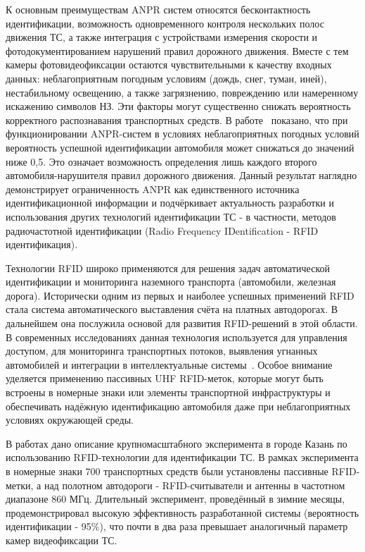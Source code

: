 \documentclass[12pt]{article}
\theoremstyle{definition}
\begin{document}
К основным преимуществам ANPR систем относятся бесконтактность идентификации, возможность одновременного контроля нескольких полос движения ТС, а также интеграция с устройствами измерения скорости и фотодокументированием нарушений правил дорожного движения. Вместе с тем камеры фотовидеофиксации остаются чувствительными к качеству входных данных: неблагоприятным погодным условиям (дождь, снег, туман, иней), нестабильному освещению, а также загрязнению, повреждению или намеренному искажению символов НЗ. Эти факторы могут существенно снижать вероятность корректного распознавания транспортных средств. В работе~\cite{Plavac2024} показано, что при функционировании ANPR-систем в условиях неблагоприятных погодных условий вероятность успешной идентификации автомобиля может снижаться до значений ниже 0,5. Это означает возможность определения лишь каждого второго автомобиля-нарушителя правил дорожного движения. Данный результат наглядно демонстрирует ограниченность ANPR как единственного источника идентификационной информации и подчёркивает актуальность разработки и использования других технологий идентификации ТС - в частности, методов радиочастотной идентификации (Radio Frequency IDentification - RFID  идентификация). \cite{StdGen2, Nikitin2008, Nikitin2012, Vishnevsky2015architecture, Larionov2017}

Технологии RFID широко применяются для решения задач автоматической идентификации и мониторинга наземного транспорта (автомобили, железная дорога). Исторически одним из первых и наиболее успешных применений RFID стала система автоматического выставления счёта на платных автодорогах. В дальнейшем она послужила основой для развития RFID-решений в этой области. В современных исследованиях данная технология используется для управления доступом, для мониторинга транспортных потоков, выявления угнанных автомобилей и интеграции в интеллектуальные системы~\cite{Mazumder2025, Nikitin2008, Ibrahim2025}. Особое внимание уделяется применению пассивных UHF RFID-меток, которые могут быть встроены в номерные знаки или элементы транспортной инфраструктуры и обеспечивать надёжную идентификацию автомобиля даже при неблагоприятных условиях окружающей среды. 

В работах \cite{Vishnevsky2016RFID, Vishn2017} дано описание крупномасштабного эксперимента в городе Казань по использованию RFID-технологии для идентификации ТС. В рамках эксперимента в номерные знаки 700 транспортных средств были установлены пассивные RFID-метки, а над полотном автодороги - RFID-считыватели и антенны в частотном диапазоне 860 МГц. Длительный эксперимент, проведённый в зимние месяцы, продемонстрировал высокую эффективность разработанной системы (вероятность идентификации - 95\%), что почти в два раза превышает аналогичный параметр камер видеофиксации ТС.
\end{document}
